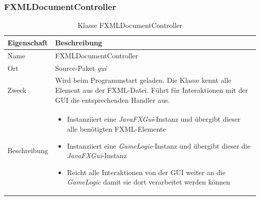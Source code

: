     \subsubsection{FXMLDocumentController}
        \begin{table}[H]
            \caption{Klasse FXMLDocumentController}
            \begin{tabular}{p{2.5cm}  p{9.5cm}} 
                \hline
                \textbf{Eigenschaft} & \textbf{Beschreibung}\\
                \hline
                Name & FXMLDocumentController\\
                Ort & Source-Paket \textit{gui}\\
                \hline
                Zweck &
                Wird beim Programmstart geladen. Die Klasse kennt alle Element aus der FXML-Datei.
                Führt für Interaktionen mit der GUI die entsprechenden Handler aus.
                \\
                \hline
                Beschreibung &
                \begin{itemize}
                    \itemsep0em
                    \item Instanziiert eine \textit{JavaFXGui}-Instanz und übergibt dieser alle benötigten FXML-Elemente
                    \item Instanziiert eine \textit{GameLogic}-Instanz und übergibt dieser die \textit{JavaFXGui}-Instanz
                    \item Reicht alle Interaktionen von der GUI weiter an die \textit{GameLogic} damit sie dort verarbeitet werden können
                \end{itemize}
                \\
                \hline
            \end{tabular}
        \end{table}
